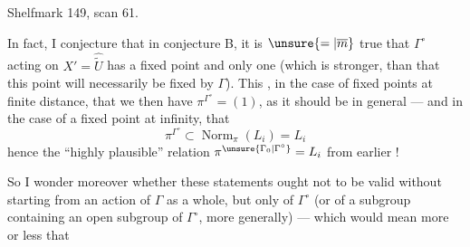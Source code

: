 Shelfmark 149, scan 61.

In fact, I conjecture that in conjecture B, it is $\unsure{=|\overline m}$ true that $\Gamma^\circ$ acting on $X'=\widehat{\widetilde U}$ has a fixed point and only one (which is stronger, than that this  point will necessarily be fixed by $\Gamma$). This , in the case of fixed points at finite distance, that we then have $\pi^{\Gamma^\circ}=(1)$, as it should be in general --- and in the case of a fixed point at infinity, that
\[
\pi^{\Gamma^\circ}\subset\operatorname{Norm}_{\pi}(L_i)=L_i
\]
hence the ``highly plausible'' relation $\pi^{\unsure{\Gamma_0|\Gamma^\circ}}=L_i$ from earlier !

So I wonder moreover whether these statements ought not to be valid without starting from an action of $\Gamma$  as a whole, but only of $\Gamma^\circ$ (or of a subgroup containing an open subgroup of $\Gamma^\circ$, more generally) --- which would mean more or less that

